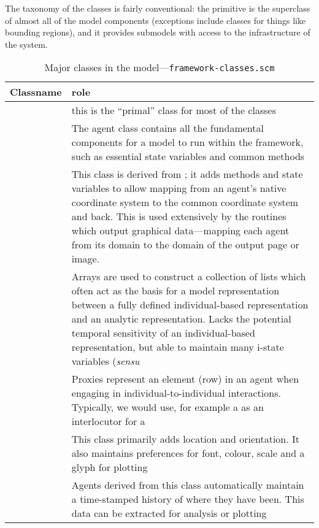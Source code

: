 The taxonomy of the classes is fairly conventional: the primitive
\magent is the superclass of almost all of the model components
(exceptions include classes for things like bounding regions), and it
provides submodels with access to the infrastructure of the system. 

\begin{table}[h]
\begin{center}
  \caption{Major classes in the model---\texttt{framework-classes.scm}}
  \begin{tabular}{l L{7cm}}
    \toprule 
    \textbf{Classname} & \textbf{role} \\
    \midrule
     & this is the ``primal'' class for most of the
    classes\\
     & The agent class contains all the fundamental
    components for a model to run within the framework, such as
    essential state variables and common methods \\
     & This class is derived from ;
    it adds methods and state variables to allow mapping from an
    agent's native coordinate system to the common coordinate system
    and back. This is used extensively by the routines which output
    graphical data---mapping each agent from its domain to the domain
    of the output page or image.\\
     & Arrays are used to construct a collection of
    lists which often act as the basis for a model representation
    between a fully defined individual-based representation and an
    analytic representation.  Lacks the potential temporal sensitivity
    of an individual-based representation, but able to maintain many
    i-state variables (\textit{sensu}\/ \\
     & Proxies represent an element (row) in an
     agent when engaging in individual-to-individual
    interactions.  Typically, we would use, for example a
     as an interlocutor for a 
    \\
     & This class primarily adds location and
    orientation.  It also maintains preferences for font, colour, scale and
    a glyph for plotting\\
     & Agents derived from this class automatically
    maintain a time-stamped history of where they have been. This data
    can be extracted for analysis or plotting\\

\end{tabular}
\end{center}
\end{table}
